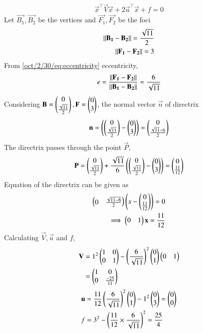 \begin{align}
     \vec{x}^{\top}\vec{V}\vec{x}+2\vec{u}^{\top}\vec{x}+f=0
\end{align}
Let $\vec{B_1}, \vec{B_2}$ be the vertices and $\vec{F_1}, \vec{F_2}$ be the foci
\begin{align}
    \left\lVert\mathbf{B_1}-\mathbf{B_2}\right\rVert = \frac{\sqrt{11}}{2}\\
    \left\lVert\mathbf{F_1}-\mathbf{F_2}\right\rVert = 3
\end{align}
From \eqref{oct/2/30/eq:eccentricity} eccentricity,
\begin{align}
    e = \frac{\left\lVert\mathbf{F_1}-\mathbf{F_2}\right\rVert}{\left\lVert\mathbf{B_1}-\mathbf{B_2}\right\rVert} = \frac{6}{\sqrt{11}} 
\end{align}
Considering $\mathbf{B} = \begin{pmatrix}0\\\frac{\sqrt{11}}{2}\end{pmatrix}, \mathbf{F} = \begin{pmatrix}0\\3\end{pmatrix}$, the normal vector $\vec{n}$ of directrix
\begin{align}
    \mathbf{n} = \left(\begin{pmatrix}0\\\frac{\sqrt{11}}{2}\end{pmatrix}-\begin{pmatrix}0\\3\end{pmatrix}\right) =  \begin{pmatrix}0\\\frac{\sqrt{11}-6}{2}\end{pmatrix}
\end{align}
The directrix passes through the point $\vec{P}$,
\begin{align}
    \mathbf{P} = \begin{pmatrix}0\\\frac{\sqrt{11}}{2}\end{pmatrix} +\frac{\sqrt{11}}{6}\left(\begin{pmatrix}0\\\frac{\sqrt{11}}{2}\end{pmatrix}-\begin{pmatrix}0\\3\end{pmatrix}\right)= \begin{pmatrix}0\\\frac{11}{12}\end{pmatrix}
\end{align}
Equation of the directrix can be given as
\begin{align}
    \begin{pmatrix}0&\frac{\sqrt{11-6}}{2}\end{pmatrix}\left(x - \begin{pmatrix}0\\\frac{11}{12}\end{pmatrix}\right) = 0\\
    \implies \begin{pmatrix}0&1\end{pmatrix}\mathbf{x} = \frac{11}{12}
\end{align}
Calculating $\vec{V}, \vec{u}$ and $f$,
\begin{align}
    \mathbf{V} &= 1^2\begin{pmatrix}1&0\\0&1\end{pmatrix} - \left(\frac{6}{\sqrt{11}}\right)^2\begin{pmatrix}0\\1\end{pmatrix}\begin{pmatrix}0&1\end{pmatrix}\\
    &= \begin{pmatrix}1&0\\0&\frac{-25}{11}\end{pmatrix}
\end{align}
\begin{align}
     \mathbf{u} &= \frac{11}{12}\left(\frac{6}{\sqrt{11}}\right)^2\begin{pmatrix}0\\1\end{pmatrix} - 1^2\begin{pmatrix}0\\3\end{pmatrix}=\begin{pmatrix}0\\0\end{pmatrix}\\
    f &= 3^2 - \left(\frac{11}{12}\times\frac{6}{\sqrt{11}}\right)^2 = \frac{25}{4}
\end{align}
